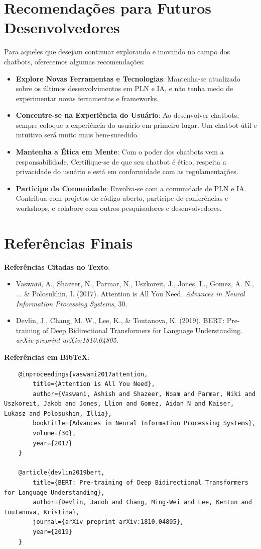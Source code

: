 \documentclass[14pt,a4paper,oneside]{book}
\begin{document}
\section{Recomendações para Futuros Desenvolvedores}

Para aqueles que desejam continuar explorando e inovando no campo dos chatbots, oferecemos algumas recomendações:

\begin{itemize}
	\item \textbf{Explore Novas Ferramentas e Tecnologias}: Mantenha-se atualizado sobre os últimos desenvolvimentos em PLN e IA, e não tenha medo de experimentar novas ferramentas e frameworks.
	\item \textbf{Concentre-se na Experiência do Usuário}: Ao desenvolver chatbots, sempre coloque a experiência do usuário em primeiro lugar. Um chatbot útil e intuitivo será muito mais bem-sucedido.
	\item \textbf{Mantenha a Ética em Mente}: Com o poder dos chatbots vem a responsabilidade. Certifique-se de que seu chatbot é ético, respeita a privacidade do usuário e está em conformidade com as regulamentações.
	\item \textbf{Participe da Comunidade}: Envolva-se com a comunidade de PLN e IA. Contribua com projetos de código aberto, participe de conferências e workshops, e colabore com outros pesquisadores e desenvolvedores.
\end{itemize}

\section{Referências Finais}

\textbf{Referências Citadas no Texto}:

\begin{itemize}
	\item Vaswani, A., Shazeer, N., Parmar, N., Uszkoreit, J., Jones, L., Gomez, A. N., ... \& Polosukhin, I. (2017). Attention is All You Need. \textit{Advances in Neural Information Processing Systems}, 30.
	\item Devlin, J., Chang, M. W., Lee, K., \& Toutanova, K. (2019). BERT: Pre-training of Deep Bidirectional Transformers for Language Understanding. \textit{arXiv preprint arXiv:1810.04805}.
\end{itemize}

\textbf{Referências em BibTeX}:

\begin{verbatim}
	@inproceedings{vaswani2017attention,
		title={Attention is All You Need},
		author={Vaswani, Ashish and Shazeer, Noam and Parmar, Niki and Uszkoreit, Jakob and Jones, Llion and Gomez, Aidan N and Kaiser, Lukasz and Polosukhin, Illia},
		booktitle={Advances in Neural Information Processing Systems},
		volume={30},
		year={2017}
	}
	
	@article{devlin2019bert,
		title={BERT: Pre-training of Deep Bidirectional Transformers for Language Understanding},
		author={Devlin, Jacob and Chang, Ming-Wei and Lee, Kenton and Toutanova, Kristina},
		journal={arXiv preprint arXiv:1810.04805},
		year={2019}
	}
\end{verbatim}
\end{document}
